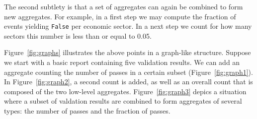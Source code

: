 \documentclass[a4paper, 11pt,titlepage]{article}
\newcommand{\onwaar}{{\normalfont \texttt{False}}}
\begin{document}
The second subtlety is that a set of aggregates can again be combined to form
new aggregates. For example, in a first step we may compute the fraction of
events yielding \onwaar{} per economic sector. In a next step we count for how
many sectors this number is less than or equal to 0.05.

Figure~\ref{fig:graphs} illustrates the above points in a graph-like structure.
Suppose we start with a basic report containing five validation results. We can
add an aggregate counting the number of passes in a certain subset
(Figure~\ref{fig:graph1}).  In Figure~\ref{fig:graph2}, a second count is
added, as well as an overall count that is composed of the two low-level
aggregates. Figure~\ref{fig:graph3} depics a situation where a subset of
valdation results are combined to form aggregates of several types: the number
of passes and the fraction of passes.
%
\end{document}
